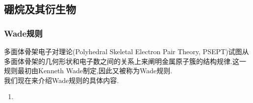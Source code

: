 \documentclass{ctexart}
\begin{document}
\subsection{硼烷及其衍生物}
\subsubsection{Wade规则}
多面体骨架电子对理论(Polyhedral Skeletal Electron Pair Theory, PSEPT)试图从多面体骨架的几何形状和电子数之间的关系上来阐明金属原子簇的结构规律.这一规则最初由Kenneth Wade制定,因此又被称为Wade规则.\\
\indent 我们现在来介绍Wade规则的具体内容.
\begin{enumerate}[label=\tbf{\arabic*.},topsep=0pt,parsep=0pt,itemsep=0pt,partopsep=0pt]
    \item 
\end{enumerate}
\end{document}
